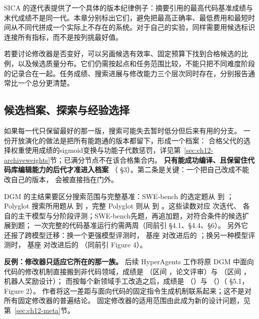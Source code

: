 SICA 的逐代表提供了一个具体的版本纪律例子：摘要引用的最高代码基准成绩与末代成绩不是同一代\cite{sica-2504}。本章分别标出它们，避免把最高正确率、最低费用和最短时间从不同代拼成一个实际上不存在的系统。对于自己的实验，同样需要用候选标识连接所有指标，而不是按列挑最好值。

若要讨论修改器是否变好，可以另画候选有效率、固定预算下找到合格候选的比例，以及候选质量分布。它们仍需按起点和任务范围比较，不能只把不同难度阶段的记录合在一起。任务成绩、搜索进展与修改能力三个层次同时存在，分别报告通常比一个总分更清楚。

\subsection{候选档案、探索与经验选择}
\label{sec:ch12-archive}

\begin{sloppypar}
如果每一代只保留最好的那一版，搜索可能失去暂时低分但后来有用的分支。
一份开放演化的做法是把所有能跑通的版本都留下，形成一个档案：
合格父代的选择权重使用成绩的sigmoid变换与功能子代数惩罚，详见第~\ref{sec:ch12-archiveweights}节；已满分节点不在该合格集合内。
\textbf{只有能成功编译、且保留住代码库编辑能力的后代才准进入档案}
（\cite{dgm-2505} §3）。第二条是关键：一个把自己改成不能改自己的版本，
会被直接挡在门外。
\end{sloppypar}

\begin{sloppypar}
DGM 的主结果要区分搜索范围与完整基准：SWE-bench 的选定题从  到 ；Polyglot 搜索所用题从  到 ，完整 Polyglot 则从  到 。这些读数对应  次迭代、
各自的主干模型与分阶段评测；SWE-bench先题，再追加题，对符合条件的候选扩展到题；
一次完整的代码基准运行约需两周（同前引 §4.1、§4.4、§6）。
另外它还报了跨模型迁移：换一个更强模型评测时，
基座  对改进后的 ；换另一种模型评测时，
基座  对改进后的 （同前引 Figure 4）。
\end{sloppypar}

\begin{pitfallbox}
\textbf{反例：修改器只适应它所在的那一族。}
后续 HyperAgents 工作将原 DGM 中面向代码的修改机制直接搬到非代码领域，成绩是 
（区间 ，论文评审）与 （区间 ，机器人奖励设计）；
而按每个新领域手工改造之后，成绩是 （）与
（）（\cite{hyperagents-2603} §5.1，Figure 2）。
作者将这一差距与面向代码的固定指令生成机制联系起来；这不是对所有固定修改器的普遍结论。
固定修改器的适用范围由此成为新的设计问题，见第~\ref{sec:ch12-meta}节。
\end{pitfallbox}

